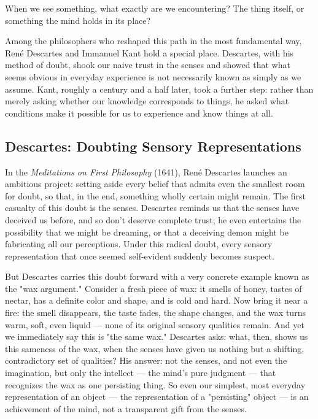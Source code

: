 When we see something, what exactly are we encountering? The thing itself, or something the mind holds in its place?

Among the philosophers who reshaped this path in the most fundamental way, René Descartes and Immanuel Kant hold a special place. Descartes, with his method of doubt, shook our naive trust in the senses and showed that what seems obvious in everyday experience is not necessarily known as simply as we assume. Kant, roughly a century and a half later, took a further step: rather than merely asking whether our knowledge corresponds to things, he asked what conditions make it possible for us to experience and know things at all.

\subsection{Descartes: Doubting Sensory Representations}
\label{sub:descartes-doubt}

In the \textit{Meditations on First Philosophy} (1641), René Descartes launches an ambitious project: setting aside every belief that admits even the smallest room for doubt, so that, in the end, something wholly certain might remain. The first casualty of this doubt is the senses. Descartes reminds us that the senses have deceived us before, and so don't deserve complete trust; he even entertains the possibility that we might be dreaming, or that a deceiving demon might be fabricating all our perceptions. Under this radical doubt, every sensory representation that once seemed self-evident suddenly becomes suspect\autocite{descartes-meditations}.

But Descartes carries this doubt forward with a very concrete example known as the "wax argument." Consider a fresh piece of wax: it smells of honey, tastes of nectar, has a definite color and shape, and is cold and hard. Now bring it near a fire: the smell disappears, the taste fades, the shape changes, and the wax turns warm, soft, even liquid --- none of its original sensory qualities remain. And yet we immediately say this is "the same wax." Descartes asks: what, then, shows us this sameness of the wax, when the senses have given us nothing but a shifting, contradictory set of qualities? His answer: not the senses, and not even the imagination, but only the intellect --- the mind's pure judgment --- that recognizes the wax as one persisting thing\autocite{descartes-meditations}. So even our simplest, most everyday representation of an object --- the representation of a "persisting" object --- is an achievement of the mind, not a transparent gift from the senses.

